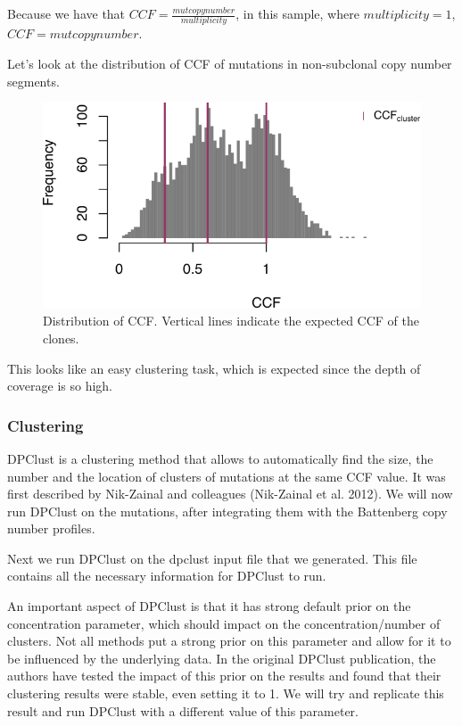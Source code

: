 \documentclass[]{article}
\begin{document}
Because we have that \(CCF=\frac{mutcopynumber}{multiplicity}\), in this
sample, where \(multiplicity=1\), \(CCF=mutcopynumber\).

Let's look at the distribution of CCF of mutations in non-subclonal copy
number segments.

\begin{figure}

{\centering \includegraphics{src_guide_files/figure-latex/fig8-1} 

}

\caption{\label{fig8} Distribution of CCF. Vertical lines indicate the expected CCF of the clones.}\label{fig:fig8}
\end{figure}

This looks like an easy clustering task, which is expected since the
depth of coverage is so high.

\hypertarget{clustering}{%
\subsubsection{Clustering}\label{clustering}}

DPClust is a clustering method that allows to automatically find the
size, the number and the location of clusters of mutations at the same
CCF value. It was first described by Nik-Zainal and colleagues
(Nik-Zainal et al. 2012). We will now run DPClust on the mutations,
after integrating them with the Battenberg copy number profiles.

Next we run DPClust on the dpclust input file that we generated. This
file contains all the necessary information for DPClust to run.

An important aspect of DPClust is that it has strong default prior on
the concentration parameter, which should impact on the
concentration/number of clusters. Not all methods put a strong prior on
this parameter and allow for it to be influenced by the underlying data.
In the original DPClust publication, the authors have tested the impact
of this prior on the results and found that their clustering results
were stable, even setting it to 1. We will try and replicate this result
and run DPClust with a different value of this parameter.
\end{document}
